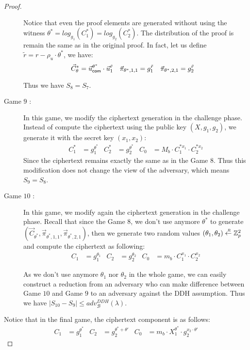 \begin{proof}
\begin{description}
    Notice that even the proof elements are generated without using the witness $\theta^* = log_{g_1}(C_1^*) = log_{g_2}(C_2^*)$. The distribution of the proof is remain the same as in the original proof. In fact, let us define $\tilde{r} = r - \rho_u \cdot \theta^*$, we have:
    \begin{align*}
      \vec{C}_{\theta}^* &= \vec{u}_{\mathsf{com}}^{\theta^*} \cdot \vec{u}_1^{\tilde{r}} &  \vec{\pi}_{\theta^*,1,1} &= g_1^{\tilde{r}} & \vec{\pi}_{\theta^*,2,1} &= g_2^{\tilde{r}}
    \end{align*}

    Thus we have $S_8 = S_7$.

  \item[\textsf{Game} $9$ :] In this game, we modify the ciphertext generation in the challenge phase. Instead of compute the ciphertext using the public key $(X, g_1, g_2)$, we generate it with the secret key $(x_1, x_2)$:
    \begin{align*}
      C_1^* &= g_1^{\theta^*} & C_2^* &= g_2^{\theta^*} & C_0 &= M_b\cdot C_1^{*x_1} \cdot C_2^{*x_2}  
    \end{align*}
    Since the ciphertext remains exactly the same as in the \textsf{Game} $8$. Thus this modification does not change the view of the adversary, which means $S_9 = S_8$.


  \item[\textsf{Game} $10$ :] In this game, we modify again the ciphertext generation in the challenge phase. Recall that since the \textsf{Game} $8$, we don't use anymore $\theta^{*}$ to generate $(\vec{C}_{\theta^*}, \vec{\pi}_{\theta^*,1,1}, \vec{\pi}_{\theta^*,2,1})$, then we generate two random values $(\theta_1, \theta_2) \stackrel{{\scriptscriptstyle \mkern4mu R}}{\gets} \mathbb{Z}_p^2$ and compute the ciphertext as following:
    \begin{align*}
      C_1 &= g_1^{\theta_1} & C_2 &= g_2^{\theta_2} & C_0 &= m_b \cdot C_1^{x_1} \cdot C_2^{x_2}
    \end{align*}

    As we don't use anymore $\theta_1$ nor $\theta_2$ in the whole game, we can easily construct a reduction from an adversary who can make difference between \textsf{Game} $10$ and \textsf{Game} $9$ to an adversary against the DDH assumption. Thus we have $|S_{10} - S_9| \leq adv_{\mathcal{B}}^{DDH}(\lambda)$.
    
  \end{description}

  Notice that in the final game, the ciphertext component is as follows:
  \begin{align*}
    C_1 &= g_1^{\theta^*} & C_2 &= g_2^{\theta^*+ \theta'} & C_0 &= m_b \cdot X_1^{\theta^*} \cdot g_2^{x_2 \cdot \theta'}
  \end{align*}


\end{proof}
